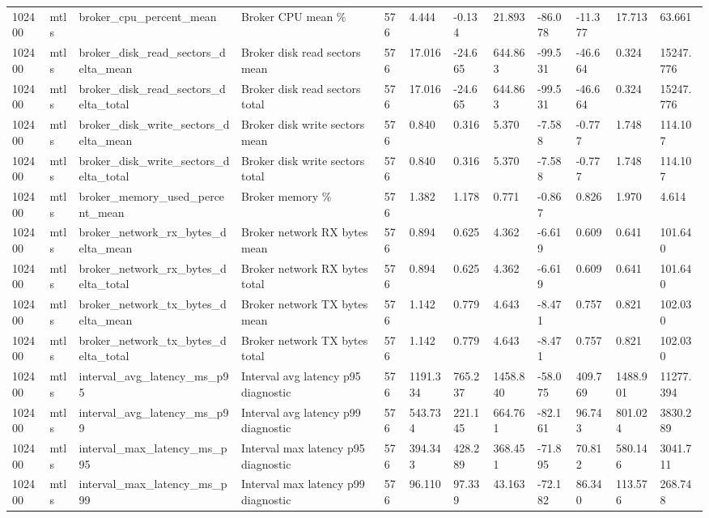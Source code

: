 \begin{longtable}{llllllllllll}
102400 & mtls & broker\_cpu\_percent\_mean & Broker CPU mean \% & 576 & 4.444 & -0.134 & 21.893 & -86.078 & -11.377 & 17.713 & 63.661 \\
102400 & mtls & broker\_disk\_read\_sectors\_delta\_mean & Broker disk read sectors mean & 576 & 17.016 & -24.665 & 644.863 & -99.531 & -46.664 & 0.324 & 15247.776 \\
102400 & mtls & broker\_disk\_read\_sectors\_delta\_total & Broker disk read sectors total & 576 & 17.016 & -24.665 & 644.863 & -99.531 & -46.664 & 0.324 & 15247.776 \\
102400 & mtls & broker\_disk\_write\_sectors\_delta\_mean & Broker disk write sectors mean & 576 & 0.840 & 0.316 & 5.370 & -7.588 & -0.777 & 1.748 & 114.107 \\
102400 & mtls & broker\_disk\_write\_sectors\_delta\_total & Broker disk write sectors total & 576 & 0.840 & 0.316 & 5.370 & -7.588 & -0.777 & 1.748 & 114.107 \\
102400 & mtls & broker\_memory\_used\_percent\_mean & Broker memory \% & 576 & 1.382 & 1.178 & 0.771 & -0.867 & 0.826 & 1.970 & 4.614 \\
102400 & mtls & broker\_network\_rx\_bytes\_delta\_mean & Broker network RX bytes mean & 576 & 0.894 & 0.625 & 4.362 & -6.619 & 0.609 & 0.641 & 101.640 \\
102400 & mtls & broker\_network\_rx\_bytes\_delta\_total & Broker network RX bytes total & 576 & 0.894 & 0.625 & 4.362 & -6.619 & 0.609 & 0.641 & 101.640 \\
102400 & mtls & broker\_network\_tx\_bytes\_delta\_mean & Broker network TX bytes mean & 576 & 1.142 & 0.779 & 4.643 & -8.471 & 0.757 & 0.821 & 102.030 \\
102400 & mtls & broker\_network\_tx\_bytes\_delta\_total & Broker network TX bytes total & 576 & 1.142 & 0.779 & 4.643 & -8.471 & 0.757 & 0.821 & 102.030 \\
102400 & mtls & interval\_avg\_latency\_ms\_p95 & Interval avg latency p95 diagnostic & 576 & 1191.334 & 765.237 & 1458.840 & -58.075 & 409.769 & 1488.901 & 11277.394 \\
102400 & mtls & interval\_avg\_latency\_ms\_p99 & Interval avg latency p99 diagnostic & 576 & 543.734 & 221.145 & 664.761 & -82.161 & 96.743 & 801.024 & 3830.289 \\
102400 & mtls & interval\_max\_latency\_ms\_p95 & Interval max latency p95 diagnostic & 576 & 394.343 & 428.289 & 368.451 & -71.895 & 70.812 & 580.146 & 3041.711 \\
102400 & mtls & interval\_max\_latency\_ms\_p99 & Interval max latency p99 diagnostic & 576 & 96.110 & 97.339 & 43.163 & -72.182 & 86.340 & 113.576 & 268.748 \\

\end{longtable}
